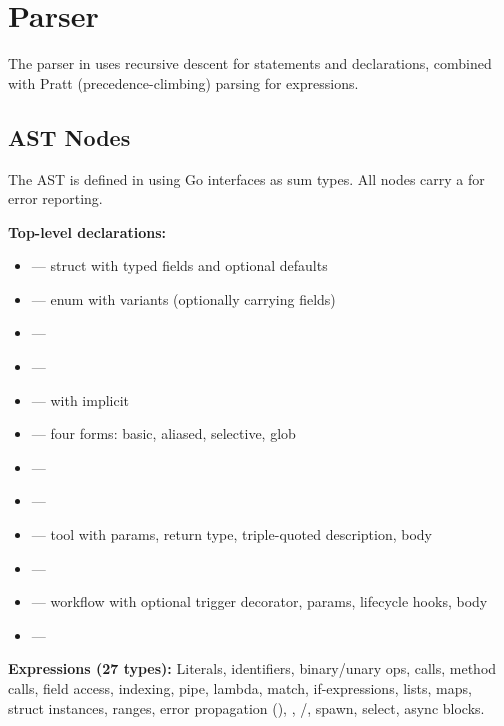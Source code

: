 \section{Parser}

The parser in  uses recursive descent for statements and declarations, combined with Pratt (precedence-climbing) parsing for expressions.

\subsection{AST Nodes}

The AST is defined in  using Go interfaces as sum types. All nodes carry a  for error reporting.

\textbf{Top-level declarations:}

\begin{itemize}
    \item {} --- struct with typed fields and optional defaults
    \item {} --- enum with variants (optionally carrying fields)
    \item {} --- 
    \item {} --- 
    \item {} ---  with implicit 
    \item {} --- four forms: basic, aliased, selective, glob
    \item {} --- 
    \item {} --- 
    \item {} --- tool with params, return type, triple-quoted description, body
    \item {} --- 
    \item {} --- workflow with optional trigger decorator, params, lifecycle hooks, body
    \item {} --- 
\end{itemize}

\textbf{Expressions (27 types):} Literals, identifiers, binary/unary ops, calls, method calls, field access, indexing, pipe, lambda, match, if-expressions, lists, maps, struct instances, ranges, error propagation (), , /, spawn, select, async blocks.

